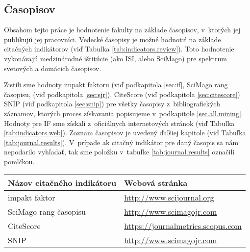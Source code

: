 \subsection{Časopisov}
\label{sec:journal.mining}

Obsahom tejto práce je hodnotenie fakulty na základe časopisov, v~ktorých jej
publikujú jej pracovníci. Vedecké časopisy je možné hodnotiť na základe
citačných indikátorov (viď Tabuľka \ref{tab:indicators.review}). Toto
hodnotenie vykonávajú medzinárodné ištitúcie (ako ISI, alebo SciMago) pre
spektrum svetových a domácich časopisov. 

Zistili sme hodnoty impakt faktoru (viď podkapitola \ref{sec:if}, SciMago rang
časopisu, (viď podkapitola \ref{sec:sjr}), CiteScore (viď podkapitola
\ref{sec:citescore}) SNIP (viď podkapitola \ref{sec:snip}) pre všetky časopisy
z~bibliografických záznamov, ktorých proces získavania popisujeme v~podkapitole
\ref{sec.all.mining}.  Hodnoty pre IF sme získali z~oficiálnych internetových
stránok (viď Tabuľka \ref{tab:indicators.web}).  Zoznam časopisov je uvedený
ďaľšiej kapitole (viď Tabuľka \ref{tab:journal.results}).  V~prípade ak
citačný indikátor pre daný časopis sa nám nepodarilo vyhľadať, tak sme položku
v~tabuľke \ref{tab:journal.results} označili pomlčkou.  

\begin{SCtable}
\centering\small
  \caption[Webové stránky citačných indikátorov na hodnotenie časopisov]
  {Zoznam citačných indikátorov na hodnotenie časopisov, s~odkazmi na oficiálne
  webové stránky}
\label{tab:indicators.web}
\begin{tabular}{ll}
  \toprule\noalign{\vspace{.3ex}}
  Názov citačného indikátoru      & Webová stránka\\[0.3ex]
  \midrule\noalign{\vspace{.5ex}}
  impakt faktor                   & {\footnotesize \url{http://www.scijournal.org}} \\[0.5ex]
  SciMago rang časopisu           & {\footnotesize \url{http://www.scimagojr.com}}\\[0.5ex]
  CiteScore                       & {\footnotesize \url{https://journalmetrics.scopus.com}} \\[0.5ex]
  SNIP                            & {\footnotesize \url{http://www.scimagojr.com}} \\[-0.25ex]
  \bottomrule
\end{tabular}
\end{SCtable}

